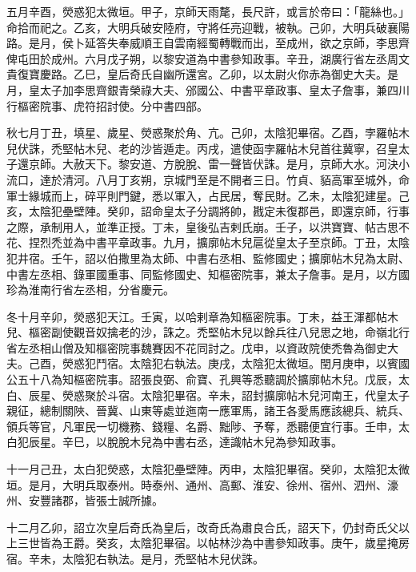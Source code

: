 \begin{pinyinscope}
 五月辛酉，熒惑犯太微垣。甲子，京師天雨氂，長尺許，或言於帝曰：「龍絲也。」命拾而祀之。乙亥，大明兵破安陸府，守將任亮迎戰，被執。己卯，大明兵破襄陽路。是月，侯卜延答失奉威順王自雲南經蜀轉戰而出，至成州，欲之京師，李思齊俾屯田於成州。六月戊子朔，以黎安道為中書參知政事。辛丑，湖廣行省左丞周文貴復寶慶路。乙巳，皇后奇氏自幽所還宮。乙卯，以太尉火你赤為御史大夫。是月，皇太子加李思齊銀青榮祿大夫、邠國公、中書平章政事、皇太子詹事，兼四川行樞密院事、虎符招討使。分中書四部。



 秋七月丁丑，填星、歲星、熒惑聚於角、亢。己卯，太陰犯畢宿。乙酉，孛羅帖木兒伏誅，禿堅帖木兒、老的沙皆遁走。丙戌，遣使函孛羅帖木兒首往冀寧，召皇太子還京師。大赦天下。黎安道、方脫脫、雷一聲皆伏誅。是月，京師大水。河決小流口，達於清河。八月丁亥朔，京城門至是不開者三日。竹貞、貊高軍至城外，命軍士緣城而上，碎平則門鍵，悉以軍入，占民居，奪民財。乙未，太陰犯建星。己亥，太陰犯壘壁陣。癸卯，詔命皇太子分調將帥，戡定未復郡邑，即還京師，行事之際，承制用人，並準正授。丁未，皇後弘吉剌氏崩。壬子，以洪寶寶、帖古思不花、捏烈禿並為中書平章政事。九月，擴廓帖木兒扈從皇太子至京師。丁丑，太陰犯井宿。壬午，詔以伯撒里為太師、中書右丞相、監修國史；擴廓帖木兒為太尉、中書左丞相、錄軍國重事、同監修國史、知樞密院事，兼太子詹事。是月，以方國珍為淮南行省左丞相，分省慶元。



 冬十月辛卯，熒惑犯天江。壬寅，以哈剌章為知樞密院事。丁未，益王渾都帖木兒、樞密副使觀音奴擒老的沙，誅之。禿堅帖木兒以餘兵往八兒思之地，命嶺北行省左丞相山僧及知樞密院事魏賽因不花同討之。戊申，以資政院使禿魯為御史大夫。己酉，熒惑犯鬥宿。太陰犯右執法。庚戌，太陰犯太微垣。閏月庚申，以賓國公五十八為知樞密院事。詔張良弼、俞寶、孔興等悉聽調於擴廓帖木兒。戊辰，太白、辰星、熒惑聚於斗宿。太陰犯畢宿。辛未，詔封擴廓帖木兒河南王，代皇太子親征，總制關陜、晉冀、山東等處並迤南一應軍馬，諸王各愛馬應該總兵、統兵、領兵等官，凡軍民一切機務、錢糧、名爵、黜陟、予奪，悉聽便宜行事。壬申，太白犯辰星。辛巳，以脫脫木兒為中書右丞，達識帖木兒為參知政事。



 十一月己丑，太白犯熒惑，太陰犯壘壁陣。丙申，太陰犯畢宿。癸卯，太陰犯太微垣。是月，大明兵取泰州。時泰州、通州、高郵、淮安、徐州、宿州、泗州、濠州、安豐諸郡，皆張士誠所據。



 十二月乙卯，詔立次皇后奇氏為皇后，改奇氏為肅良合氏，詔天下，仍封奇氏父以上三世皆為王爵。癸亥，太陰犯畢宿。以帖林沙為中書參知政事。庚午，歲星掩房宿。辛未，太陰犯右執法。是月，禿堅帖木兒伏誅。



\end{pinyinscope}